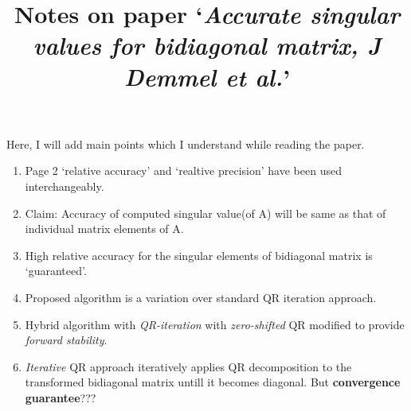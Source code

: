 \documentclass{article}
\begin{document}
\title{Notes on paper `\textit{Accurate singular values for bidiagonal matrix, J Demmel et al.}'}
\maketitle
Here, I will add main points which I understand while reading the paper.
\begin{enumerate}
\item Page 2 `relative accuracy' and `realtive precision' have been used interchangeably.
\item Claim: Accuracy of computed singular value(of A) will be same as that of individual matrix elements of A.
\item High relative accuracy for the singular elements of bidiagonal matrix is `guaranteed'.
\item Proposed algorithm is a variation over standard QR iteration approach.
\item Hybrid algorithm with \textit{QR-iteration} with \textit{zero-shifted} QR modified to provide \textit{forward stability}.
\item \textit{Iterative} QR approach iteratively applies QR decomposition to the transformed bidiagonal matrix untill it becomes diagonal. But \textbf{convergence guarantee}???
\end{enumerate}
\end{document}
